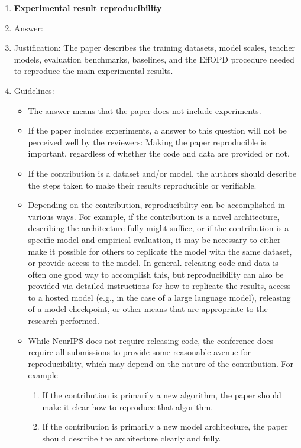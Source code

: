 \documentclass{article}
\begin{document}
\begin{enumerate}
\item {\bf Experimental result reproducibility}
    \item[] Answer: \answerYes{}
    \item[] Justification: The paper describes the training datasets, model scales, teacher models, evaluation benchmarks, baselines, and the EffOPD procedure needed to reproduce the main experimental results.
    \item[] Guidelines:
    \begin{itemize}
        \item The answer \answerNA{} means that the paper does not include experiments.
        \item If the paper includes experiments, a \answerNo{} answer to this question will not be perceived well by the reviewers: Making the paper reproducible is important, regardless of whether the code and data are provided or not.
        \item If the contribution is a dataset and\slash or model, the authors should describe the steps taken to make their results reproducible or verifiable. 
        \item Depending on the contribution, reproducibility can be accomplished in various ways. For example, if the contribution is a novel architecture, describing the architecture fully might suffice, or if the contribution is a specific model and empirical evaluation, it may be necessary to either make it possible for others to replicate the model with the same dataset, or provide access to the model. In general. releasing code and data is often one good way to accomplish this, but reproducibility can also be provided via detailed instructions for how to replicate the results, access to a hosted model (e.g., in the case of a large language model), releasing of a model checkpoint, or other means that are appropriate to the research performed.
        \item While NeurIPS does not require releasing code, the conference does require all submissions to provide some reasonable avenue for reproducibility, which may depend on the nature of the contribution. For example
        \begin{enumerate}
            \item If the contribution is primarily a new algorithm, the paper should make it clear how to reproduce that algorithm.
            \item If the contribution is primarily a new model architecture, the paper should describe the architecture clearly and fully.

\end{enumerate}
\end{itemize}
\end{enumerate}
\end{document}
